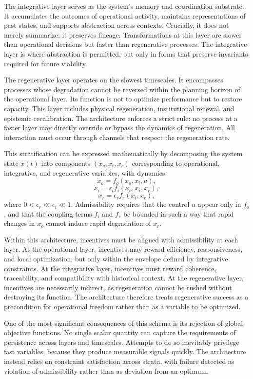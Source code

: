 \documentclass[12pt,oneside]{book}
\begin{document}
The integrative layer serves as the system’s memory and coordination substrate. It accumulates the outcomes of operational activity, maintains representations of past states, and supports abstraction across contexts. Crucially, it does not merely summarize; it preserves lineage. Transformations at this layer are slower than operational decisions but faster than regenerative processes. The integrative layer is where abstraction is permitted, but only in forms that preserve invariants required for future viability.

The regenerative layer operates on the slowest timescales. It encompasses processes whose degradation cannot be reversed within the planning horizon of the operational layer. Its function is not to optimize performance but to restore capacity. This layer includes physical regeneration, institutional renewal, and epistemic recalibration. The architecture enforces a strict rule: no process at a faster layer may directly override or bypass the dynamics of regeneration. All interaction must occur through channels that respect the regeneration rate.

This stratification can be expressed mathematically by decomposing the system state \(x(t)\) into components \((x_o, x_i, x_r)\) corresponding to operational, integrative, and regenerative variables, with dynamics
\[
\dot{x}_o = f_o(x_o, x_i, u),
\]
\[
\dot{x}_i = \epsilon_i f_i(x_o, x_i, x_r),
\]
\[
\dot{x}_r = \epsilon_r f_r(x_i, x_r),
\]
where \(0 < \epsilon_r \ll \epsilon_i \ll 1\). Admissibility requires that the control \(u\) appear only in \(f_o\), and that the coupling terms \(f_i\) and \(f_r\) be bounded in such a way that rapid changes in \(x_o\) cannot induce rapid degradation of \(x_r\).

Within this architecture, incentives must be aligned with admissibility at each layer. At the operational layer, incentives may reward efficiency, responsiveness, and local optimization, but only within the envelope defined by integrative constraints. At the integrative layer, incentives must reward coherence, traceability, and compatibility with historical context. At the regenerative layer, incentives are necessarily indirect, as regeneration cannot be rushed without destroying its function. The architecture therefore treats regenerative success as a precondition for operational freedom rather than as a variable to be optimized.

One of the most significant consequences of this schema is its rejection of global objective functions. No single scalar quantity can capture the requirements of persistence across layers and timescales. Attempts to do so inevitably privilege fast variables, because they produce measurable signals quickly. The architecture instead relies on constraint satisfaction across strata, with failure detected as violation of admissibility rather than as deviation from an optimum.
\end{document}
